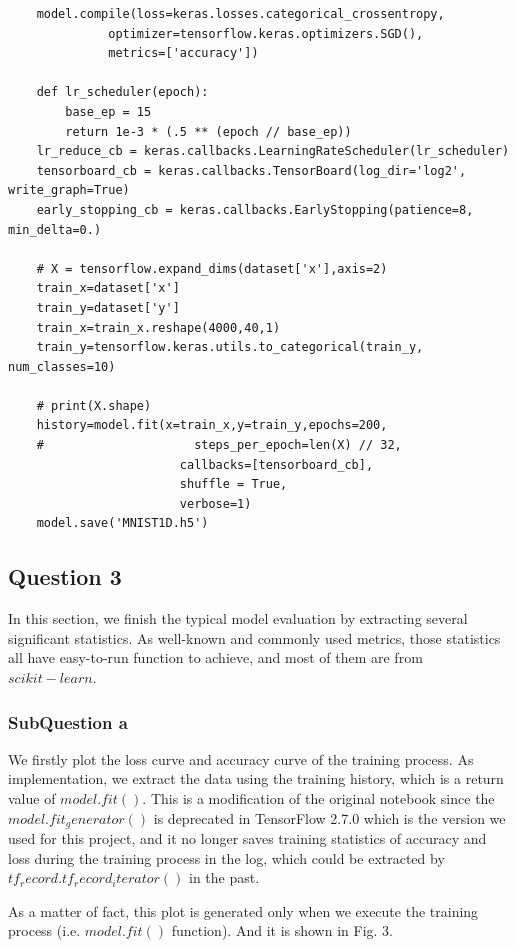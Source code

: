\documentclass[conference]{IEEEtran}
\begin{document}
\begin{lstlisting}
    model.compile(loss=keras.losses.categorical_crossentropy,
              optimizer=tensorflow.keras.optimizers.SGD(),
              metrics=['accuracy'])

    def lr_scheduler(epoch):
        base_ep = 15
        return 1e-3 * (.5 ** (epoch // base_ep))
    lr_reduce_cb = keras.callbacks.LearningRateScheduler(lr_scheduler)
    tensorboard_cb = keras.callbacks.TensorBoard(log_dir='log2', write_graph=True)
    early_stopping_cb = keras.callbacks.EarlyStopping(patience=8, min_delta=0.)

    # X = tensorflow.expand_dims(dataset['x'],axis=2)
    train_x=dataset['x']
    train_y=dataset['y']
    train_x=train_x.reshape(4000,40,1)
    train_y=tensorflow.keras.utils.to_categorical(train_y, num_classes=10)

    # print(X.shape)
    history=model.fit(x=train_x,y=train_y,epochs=200,
    #                     steps_per_epoch=len(X) // 32,
                        callbacks=[tensorboard_cb],                  
                        shuffle = True,
                        verbose=1)
    model.save('MNIST1D.h5')
\end{lstlisting}




\subsection{Question 3}

In this section, we finish the typical model evaluation by extracting several significant statistics. As well-known and commonly used metrics, those statistics all have easy-to-run function to achieve, and most of them are from $scikit-learn$.

\subsubsection{SubQuestion a}

We firstly plot the loss curve and accuracy curve of the training process. As implementation, we extract the data using the training history, which is a return value of $model.fit()$. This is a modification of the original notebook since the $model.fit_generator()$ is deprecated in TensorFlow 2.7.0 which is the version we used for this project, and it no longer saves training statistics of accuracy and loss during the training process in the log, which could be extracted by $tf_record.tf_record_iterator()$ in the past.\par
As a matter of fact, this plot is generated only when we execute the training process (i.e. $model.fit()$ function). And it is shown in Fig. 3.
\end{document}
